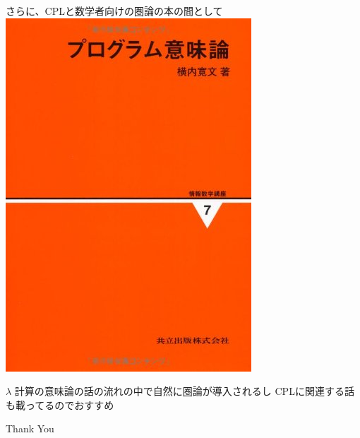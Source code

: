 \documentclass[pdflatex,12pt]{beamer}
\begin{document}
\begin{frame}
    \centering
    さらに、CPLと数学者向けの圏論の本の間として \newline
    \includegraphics[scale=0.2]{program-semantics.jpg}

    $\lambda$ 計算の意味論の話の流れの中で自然に圏論が導入されるし \newline
    CPLに関連する話も載ってるのでおすすめ
\end{frame}

\begin{frame}
    \centering
\end{frame}

\begin{frame}
    \centering
    \Large
    Thank You
\end{frame}
\end{document}
